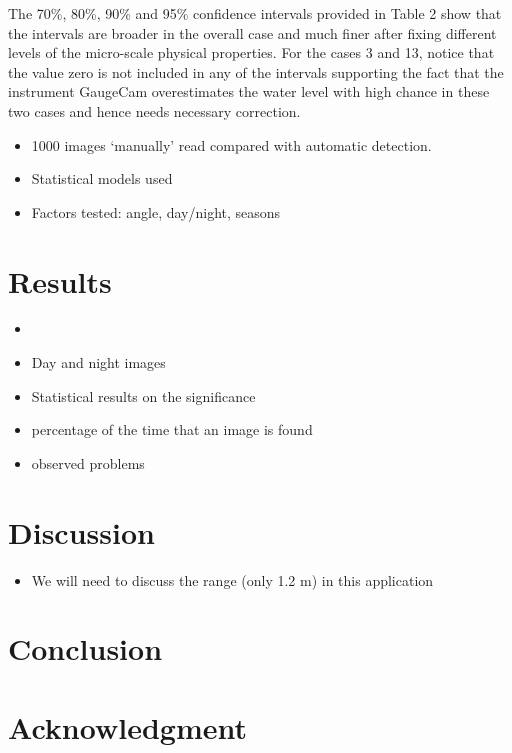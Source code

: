 \documentclass[]{article}
\providecommand{\tightlist}{%
  \setlength{\itemsep}{0pt}\setlength{\parskip}{0pt}}
\begin{document}
The 70\%, 80\%, 90\% and 95\% confidence intervals provided in Table 2 show that the intervals are broader in the overall case and much finer after fixing different levels of the micro-scale physical properties. For the cases 3 and 13, notice that the value zero is not included in any of the intervals supporting the fact that the instrument GaugeCam overestimates the water level with high chance in these two cases and hence needs necessary correction.

\begin{itemize}
\tightlist
\item
  1000 images `manually' read compared with automatic detection.
\item
  Statistical models used
\item
  Factors tested: angle, day/night, seasons
\end{itemize}

\hypertarget{results}{%
\section{Results}\label{results}}

\begin{itemize}
\item
\item
  Day and night images
\item
  Statistical results on the significance
\item
  percentage of the time that an image is found
\item
  observed problems
\end{itemize}

\hypertarget{discussion}{%
\section{Discussion}\label{discussion}}

\begin{itemize}
\tightlist
\item
  We will need to discuss the range (only 1.2 m) in this application
\end{itemize}

\hypertarget{conclusion}{%
\section{Conclusion}\label{conclusion}}

\hypertarget{acknowledgment}{%
\section{Acknowledgment}\label{acknowledgment}}
\end{document}
